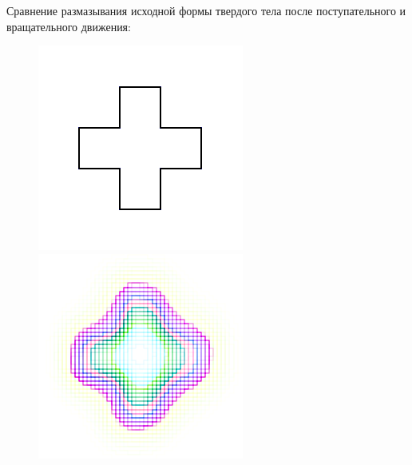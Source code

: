 \documentclass[12pt,a4paper]{article}
\begin{document}
Сравнение размазывания исходной формы твердого тела после поступательного и вращательного движения:
\begin{figure}[H]
\centering
\begin{minipage}{.25\textwidth}
  \centering
  \includegraphics[width=\linewidth]{Pictures/PlusInit.png}
\end{minipage}%
\begin{minipage}{.25\textwidth}
  \centering
  \includegraphics[width=\linewidth]{Pictures/PlusMUSCL.png}

\end{minipage}
\end{figure}
\end{document}

